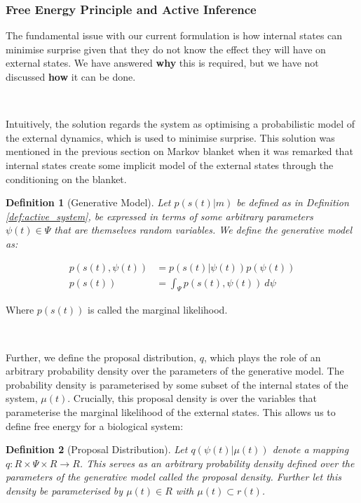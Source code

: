 \documentclass{article}
\newtheorem{definition}{Definition}
\begin{document}
\subsubsection{Free Energy Principle and Active Inference}

The fundamental issue with our current formulation is how internal states can minimise surprise given that they do not know the effect they will have on external states. We have answered \textbf{why} this is required, but we have not discussed \textbf{how} it can be done.

\

Intuitively, the solution regards the system as optimising a probabilistic model of the external dynamics, which is used to minimise surprise. This solution was mentioned in the previous section on Markov blanket when it was remarked that internal states create some implicit model of the external states through the conditioning on the blanket.

\begin{definition}[Generative Model]\label{def:generative_model}
Let $p(s(t)|m)$ be defined as in Definition \ref{def:active_system}, be expressed in terms of some arbitrary parameters $\psi(t) \in \Psi$ that are themselves random variables. We define the generative model as:

\begin{equation*}
	\begin{aligned}
		p(s(t), \psi(t)) &= p(s(t)|\psi(t))p(\psi(t)) \\
		p(s(t)) &= \int_\Psi p(s(t), \psi(t)) \ d\psi
	\end{aligned}
\end{equation*}
\end{definition}

Where $p(s(t))$ is called the marginal likelihood. 

\

Further, we define the proposal distribution, $q$, which plays the role of an arbitrary probability density over the parameters of the generative model. The probability density is parameterised by some subset of the internal states of the system, $\mu(t)$. Crucially, this proposal density is over the variables that parameterise the marginal likelihood of the external states. This allows us to define free energy for a biological system:

\begin{definition}[Proposal Distribution]\label{def:proposal_distribution}
Let $q(\psi(t) | \mu(t))$ denote a mapping $q: R \times \Psi \times R \to R$. This serves as an arbitrary probability density defined over the parameters of the generative model called the proposal density. Further let this density be parameterised by $\mu(t) \in R$ with $\mu(t) \subset r(t)$. 
\end{definition}
\end{document}

